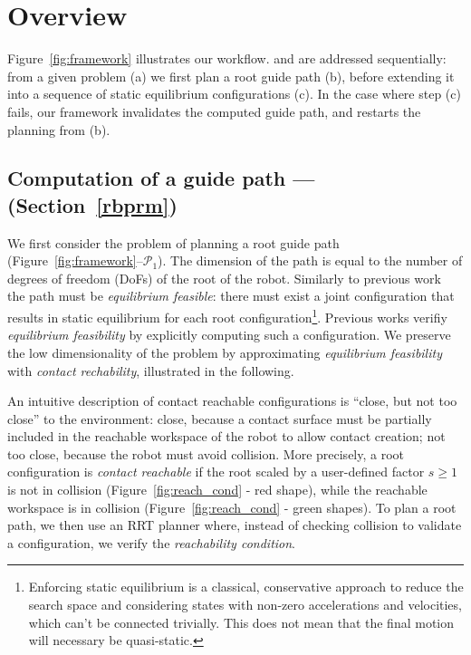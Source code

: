 \section{Overview}
\label{overview}


Figure~\ref{fig:framework} illustrates our workflow.
\Pa and \Pb are addressed sequentially: from a given problem (a) we first plan a root guide path (b), before
extending it into a sequence of static equilibrium configurations (c). In the case where step (c) fails,
our framework invalidates the computed guide path, and restarts the planning from (b).

%

\subsection{Computation of a guide path --- \Pa (Section~\ref{rbprm})}
We first consider the problem of planning a root guide path (Figure~\ref{fig:framework}--$\mathcal{P}_1$).  The dimension of the path is equal to the number of degrees of freedom (DoFs) of the root of the robot.
Similarly to previous work~\citep{Bouyarmane2009} the path must be \textit{equilibrium feasible}: there must exist a joint configuration that results in static equilibrium for each root configuration\footnote{Enforcing static equilibrium is a classical, conservative approach to reduce the search space and considering states  with non-zero accelerations and velocities, which can't be connected trivially. This does not mean that the final motion will necessary be quasi-static.}. Previous works verifiy \textit{equilibrium feasibility} by explicitly computing such a configuration. We preserve the low dimensionality of the problem by approximating \textit{equilibrium feasibility} with \textit{contact rechability}, illustrated in the following.

An intuitive description of \gls{contact reachable} configurations is ``close, but not too close'' to the environment: close, because a contact surface must be partially included in the reachable workspace of the robot to allow contact creation; not too close, because the robot must avoid collision.
More precisely, a root configuration is \textit{contact reachable} if the root scaled by a user-defined factor $s \geq 1$ is not in collision (Figure~\ref{fig:reach_cond} - red shape), while the reachable workspace is in collision (Figure~\ref{fig:reach_cond} - green shapes).
To plan a root path, we then use an RRT planner where, instead of checking collision to validate a configuration, we verify the \textit{reachability condition}.

